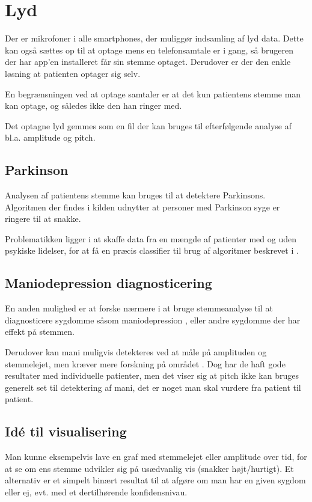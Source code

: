 \section{Lyd}
Der er mikrofoner i alle smartphones, der muliggør indsamling af lyd data.
Dette kan også sættes op til at optage mens en telefonsamtale er i gang, så brugeren der har app'en installeret får sin stemme optaget.
Derudover er der den enkle løsning at patienten optager sig selv.

En begrænsningen ved at optage samtaler er at det kun patientens stemme man kan optage, og således ikke den han ringer med.

Det optagne lyd gemmes som en fil der kan bruges til efterfølgende analyse af bl.a. amplitude og pitch.

\subsection{Parkinson}
Analysen af patientens stemme kan bruges til at detektere Parkinsons\citep{6168572}.
Algoritmen der findes i kilden udnytter at personer med Parkinson syge er ringere til at snakke.

Problematikken ligger i at skaffe data fra en mængde af patienter med og uden psykiske lidelser, for at få en præcis classifier til brug af algoritmer beskrevet i \citep{6168572,6346375}.

\subsection{Maniodepression diagnosticering}
En anden mulighed er at forske nærmere i at bruge stemmeanalyse til at diagnosticere sygdomme såsom maniodepression \citep{6346375}, eller andre sygdomme der har effekt på stemmen.

Derudover kan mani muligvis detekteres ved at måle på amplituden og stemmelejet, men kræver mere forskning på området \citep{6346375}.
Dog har de haft gode resultater med individuelle patienter, men det viser sig at pitch ikke kan bruges generelt set til detektering af mani, det er noget man skal vurdere fra patient til patient.
	
\subsection{Idé til visualisering}
Man kunne eksempelvis lave en graf med stemmelejet eller amplitude over tid, for at se om ens stemme udvikler sig på usædvanlig vis (snakker højt/hurtigt).
Et alternativ er et simpelt binært resultat til at afgøre om man har en given sygdom eller ej, evt. med et dertilhørende konfidensnivau.
